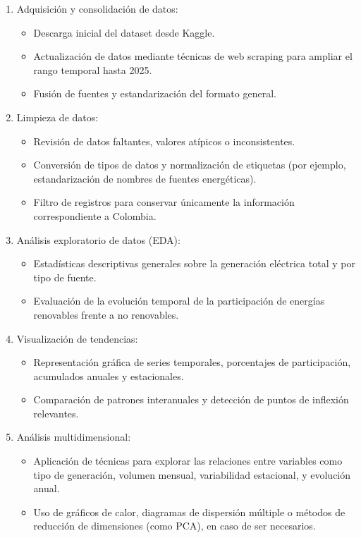 \documentclass{article}
\begin{document}
\begin{enumerate}
	\item Adquisición y consolidación de datos:
	\begin{itemize}
		\item Descarga inicial del dataset desde Kaggle.		
		\item Actualización de datos mediante técnicas de web scraping para ampliar el rango temporal hasta 2025.		
		\item Fusión de fuentes y estandarización del formato general.		
	\end{itemize}
	\item Limpieza de datos:
	\begin{itemize}
		\item Revisión de datos faltantes, valores atípicos o inconsistentes.
		\item Conversión de tipos de datos y normalización de etiquetas (por ejemplo, estandarización de nombres de fuentes energéticas).
		\item Filtro de registros para conservar únicamente la información correspondiente a Colombia.
	\end{itemize}
	\item Análisis exploratorio de datos (EDA):
	\begin{itemize}
		\item Estadísticas descriptivas generales sobre la generación eléctrica total y por tipo de fuente.		
		\item Evaluación de la evolución temporal de la participación de energías renovables frente a no renovables.
	\end{itemize}
	\item Visualización de tendencias:
	\begin{itemize}
		\item Representación gráfica de series temporales, porcentajes de participación, acumulados anuales y estacionales.		
		\item Comparación de patrones interanuales y detección de puntos de inflexión relevantes.
	\end{itemize}
	\item Análisis multidimensional:
	\begin{itemize}
		\item Aplicación de técnicas para explorar las relaciones entre variables como tipo de generación, volumen mensual, variabilidad estacional, y evolución anual.		
		\item Uso de gráficos de calor, diagramas de dispersión múltiple o métodos de reducción de dimensiones (como PCA), en caso de ser necesarios.
	\end{itemize}	
\end{enumerate}
\end{document}
